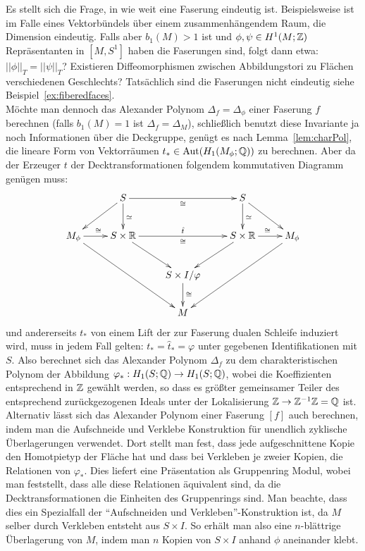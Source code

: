 \begin{bsp}
        Es stellt sich die Frage, in wie weit eine Faserung eindeutig ist. Beispielsweise ist im Falle eines Vektorbündels über einem zusammenhängendem Raum, die Dimension eindeutig. Falls aber $b_1(M)>1$ ist und $\phi,\psi \in H^1(M;\mathbb{Z})$ Repräsentanten in $[M,S^1]$ haben die Faserungen sind, folgt dann etwa: $||\phi||_T=||\psi||_T$? Existieren Diffeomorphismen zwischen Abbildungstori zu Flächen verschiedenen Geschlechts? Tatsächlich sind die Faserungen nicht eindeutig siehe Beispiel~\ref{ex:fiberedfaces}.\\
    	Möchte man dennoch das Alexander Polynom $\Delta_f=\Delta_\phi$ einer Faserung $f$ berechnen (falls $b_1(M)=1$ ist $\Delta_f=\Delta_M$), schließlich benutzt diese Invariante ja noch Informationen über die Deckgruppe, genügt es nach Lemma~\ref{lem:charPol}, die lineare Form von Vektorräumen $t_* \in \operatorname{Aut}(H_1(M_\phi;\mathbb{Q}))$ zu berechnen. Aber da der Erzeuger $t$ der Decktransformationen folgendem kommutativen Diagramm genügen muss:
    	\begin{equation*}
     		    	\begin{xy}
    			\xymatrix{
    				&S \ar[d]^{\simeq} \ar[dl] \ar[rr]_\cong && S \ar[d]^{\simeq}\ar[dr]& \\
    				M_\phi \ar[ddrr] \ar[r]^\cong&S \times \RR \ar[rr]^{\hat t}_\cong \ar[dr] && S\times \RR \ar[dl] \ar[r]^\cong&M_\phi \ar[ddll]\\
    				&&S\times I / \varphi \ar[d]^\cong&&\\
                    &&M&&}
    		\end{xy}
    	\end{equation*}
    	und andererseits $t_*$ von einem Lift der zur Faserung dualen Schleife induziert wird, muss in jedem Fall gelten: $t_* = \hat t_* = \varphi$ unter gegebenen Identifikationen mit $S$. Also berechnet sich das Alexander Polynom $\Delta_f$ zu dem charakteristischen Polynom der Abbildung $\varphi_*:H_1(S;\mathbb{Q})\to H_1(S;\mathbb{Q})$, wobei die Koeffizienten entsprechend in $\mathbb{Z}$ gewählt werden, so dass es größter gemeinsamer Teiler des entsprechend zurückgezogenen Ideals unter der Lokalisierung $\mathbb{Z} \to \mathbb{Z}^{-1}\mathbb{Z}=\mathbb{Q}$ ist. Alternativ lässt sich das Alexander Polynom einer Faserung $[f]$ auch berechnen, indem man die Aufschneide und Verklebe Konstruktion für unendlich zyklische Überlagerungen verwendet. Dort stellt man fest, dass jede aufgeschnittene Kopie den Homotpietyp der Fläche hat und dass bei Verkleben je zweier Kopien, die Relationen von $\varphi_*$. Dies liefert eine Präsentation als Gruppenring Modul, wobei man feststellt, dass alle diese Relationen äquivalent sind, da die Decktransformationen die Einheiten des Gruppenrings sind. Man beachte, dass dies ein Spezialfall der "`Aufschneiden und Verkleben"'-Konstruktion ist, da $M$ selber durch Verkleben entsteht aus $S\times I$. So erhält man also eine $n$-blättrige Überlagerung von $M$, indem man $n$ Kopien von $S\times I$ anhand $\phi$ aneinander klebt.\\

\end{bsp}
